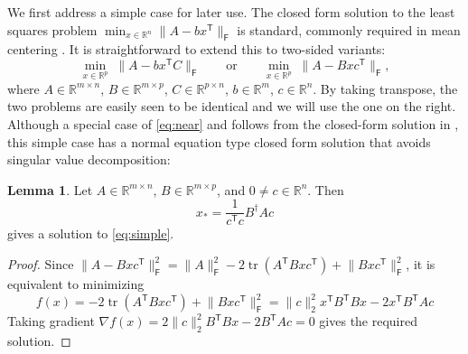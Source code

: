\documentclass[11pt,reqno]{amsart}
\newcommand{\tp}{{\scriptscriptstyle\mathsf{T}}}
\newcommand{\F}{{\scriptscriptstyle\mathsf{F}}}
\DeclareMathOperator{\tr}{tr}
\theoremstyle{definition}
\newtheorem{lemma}[theorem]{Lemma}
\numberwithin{equation}{section}
\newcommand{\R}{\mathbb{R}}
\begin{document}
We first address a simple case for later use. The closed form solution to the least squares problem $\min_{x \in \R^n} \lVert A- bx^\tp \rVert_\F$ is standard, commonly required in mean centering \cite{Marden1995}. It is straightforward to extend this to two-sided variants:
\begin{equation}\label{eq:simple}
\min_{x \in \R^p} \; \lVert A- bx^\tp C \rVert_\F \qquad \text{or} \qquad \min_{x \in \R^p} \; \lVert A- Bx c^\tp \rVert_\F,
\end{equation}
where $A \in \R^{m \times n}$, $B \in \R^{m \times p}$, $C \in \R^{p\times n}$, $b \in \R^m$, $c \in \R^n$. By taking transpose, the two problems are easily seen to be identical and we will use the one on the right. Although a special case of \eqref{eq:near} and follows from the closed-form solution in \cite[Equation~2.1]{li22}, this simple case has a normal equation type closed form solution that avoids singular value decomposition:
\begin{lemma}\label{lem:rank-1}
Let $A \in \R^{m \times n}$, $B \in \R^{m \times p}$, and $0 \ne c \in \R^n$. Then
\[
x_* = \frac{1}{ c^\tp c } B^\dagger A c
\]
gives a solution to \eqref{eq:simple}.
\end{lemma}
\begin{proof}
Since  $\lVert A- Bxc^\tp \rVert_\F^2 = \lVert A \rVert_\F^2 - 2\tr(A^\tp Bxc^\tp) + \lVert Bxc^\tp \rVert_\F^2$, it is equivalent to minimizing 
\[
    f(x) = - 2\tr(A^\tp Bxc^\tp) + \lVert Bxc^\tp \rVert_\F^2 = \lVert c\rVert_{2}^{2}x^\tp B^\tp Bx -2x^\tp B^\tp Ac
\]
Taking gradient  $\nabla f(x) = 2\lVert c \rVert_2^2 B^\tp B x - 2 B^\tp Ac= 0$ gives the required solution.
\end{proof}
\end{document}
